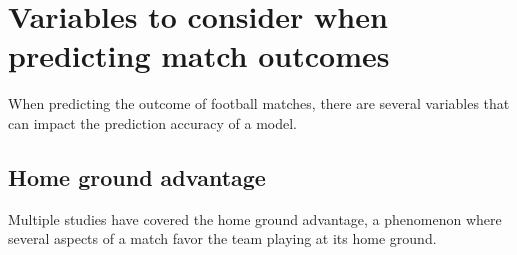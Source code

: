 \section{Variables to consider when predicting match outcomes}
\label{sec:background-variables}

When predicting the outcome of football matches, there are several variables that can impact the prediction accuracy of a model.

\subsection{Home ground advantage}

Multiple studies have covered the home ground advantage, a phenomenon where several aspects of a match favor the team playing at its home ground.

